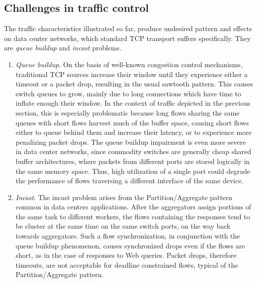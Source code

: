 \subsection{Challenges in traffic control}
The traffic characteristics illustrated so far, produce undesired pattern and effects on data center networks, which standard TCP transport suffers specifically. They are \textit{queue buildup} and \textit{incast} problems.
\begin{enumerate}
	\item \textsl{Queue buildup}. On the basis of well-known congestion control mechanisms, traditional TCP sources increase their window until they experience either a timeout or a packet drop, resulting in the usual sawtooth pattern. This causes switch queues to grow, mainly due to long connections which have time to inflate enough their window. In the context of traffic depicted in the previous section, this is especially problematic because long flows sharing the same queues with short flows harvest much of the buffer space, causing short flows either to queue behind them and increase their latency, or to experience more penalizing packet drops. The queue buildup impairment is even more severe in data center networks, since commodity switches are generally cheap shared buffer architectures, where packets from different ports are stored logically in the same memory space. Thus, high utilization of a single port could degrade the performance of flows traversing a different interface of the same device.
	\item \textsl{Incast}. The incast problem arises from the Partition/Aggregate pattern common in data centers applications. After the aggregators assign portions of the same task to different workers, the flows containing the responses tend to be cluster at the same time on the same switch ports, on the way back towards aggregators. Such a flow synchronization, in conjunction with the queue buildup phenomenon, causes synchronized drops even if the flows are short, as in the case of responses to Web queries. Packet drops, therefore timeouts, are not acceptable for deadline constrained flows, typical of the Partition/Aggregate pattern. 
\end{enumerate}
